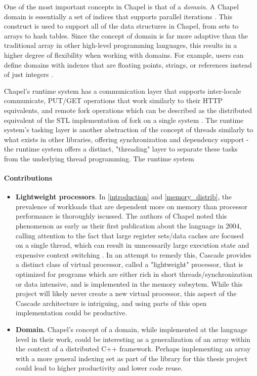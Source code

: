 	One of the most important concepts in Chapel is that of a \textit{domain}. A Chapel domain is essentially a set of indices that supports parallel iterations \cite{chapel_2007}. This construct is used to support all of the data structures in Chapel, from sets to arrays to hash tables. Since the concept of domain is far more adaptive than the traditional array in other high-level programming languages, this results in a higher degree of flexibility when working with domains. For example, users can define domains with indexes that are floating points, strings, or references instead of just integers \cite{chapel_2007}. 

	Chapel's runtime system has a communication layer that supports inter-locale communicate, PUT/GET operations that work similarly to their HTTP equivalents, and remote fork operations which can be described as the distributed equivalent of the STL implementation of fork on a single system \cite{chapel_rts_ppt}. The runtime system's tasking layer is another abstraction of the concept of threads similarly to what exists in other libraries, offering synchronization and dependency support - the runtime system offers a distinct, "threading" layer to separate these tasks from the underlying thread programming.  The runtime system 
	\paragraph{Contributions}
	\begin{itemize}
		\item \textbf{Lightweight processors}. In \ref{introduction} and \ref{memory_distrib}, the prevalence of workloads that are dependent more on memory than processor performance is thoroughly iscussed. The authors of Chapel noted this phenomenon as early as their first publication about the language in 2004, calling attention to the fact that large register sets/data caches are focused on a single thread, which can result in unncessarily large execution state and expensive context switching \cite{chapel}. In an attempt to remedy this, Cascade provides a distinct class of virtual processor, called a "lightweight" processor, that is optimized for programs which are either rich in short threads/synchronization or data intensive, and is implemented in the memory subsytem. While this project will likely never create a new virtual processor, this aspect of the Cascade architecture is intriguing, and using parts of this open implementation could be productive. 


		\item \textbf{Domain.} Chapel's concept of a domain, while implemented at the language level in their work, could be interesting as a generalization of an array within the context of a distributed C++ framework. Perhaps implementing an array with a more general indexing set as part of the library for this thesis project could lead to higher productivity and lower code reuse. 

	\end{itemize}

